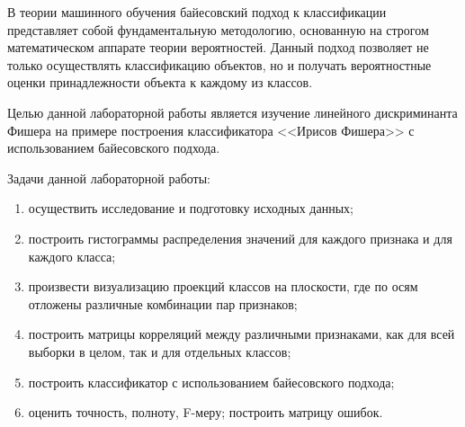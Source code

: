
В теории машинного обучения байесовский подход к классификации представляет собой фундаментальную методологию, основанную на строгом математическом аппарате теории вероятностей. Данный подход позволяет не только осуществлять классификацию объектов, но и получать вероятностные оценки принадлежности объекта к каждому из классов.

Целью данной лабораторной работы является изучение линейного дискриминанта Фишера на примере построения классификатора <<Ирисов Фишера>> с использованием байесовского подхода.

Задачи данной лабораторной работы:
\begin{enumerate}[label*=\arabic*)]
	\item осуществить исследование и подготовку исходных данных;
	\item построить гистограммы распределения значений для каждого признака и для каждого класса;
	\item произвести визуализацию проекций классов на плоскости, где по осям  отложены различные комбинации пар признаков;
	\item построить матрицы корреляций между различными признаками, как для всей выборки в целом, так и для отдельных классов;
	\item построить классификатор с использованием байесовского подхода;
	\item оценить точность, полноту, F-меру; построить матрицу ошибок.
\end{enumerate}

\clearpage
